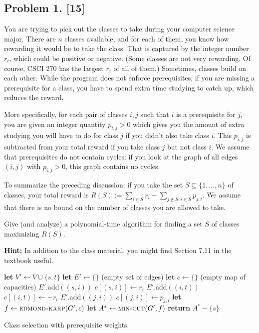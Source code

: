 \documentclass[10pt]{article}
\begin{document}
\newpage

\subsection*{Problem 1. [15]}
You are trying to pick out the classes to take during your computer science major. There are $n$ classes available, and for each of them, you know how rewarding it would be to take the class. That is captured by the integer number $r_i$, which could be positive or negative. (Some classes are not very rewarding. Of course, CSCI 270 has the largest $r_i$ of all of them.)
Sometimes, classes build on each other. While the program does not enforce prerequisites, if you are missing a prerequisite for a class, you have to spend extra time studying to catch up, which reduces the reward.

More specifically, for each pair of classes $i,j$ such that $i$ is a prerequisite for $j$, you are given an integer quantity $p_{i,j} > 0$ which gives you the amount of extra studying you will have to do for class $j$ if you didn't also take class $i$. This $p_{i,j}$ is subtracted from your total reward if you take class $j$ but not class $i$.
We assume that prerequisites do not contain cycles: if you look at the graph of all edges $(i,j)$ with $p_{i,j} > 0$, this graph contains no cycles.

To summarize the preceding discussion: if you take the set $S \subseteq \{1, \ldots, n\}$ of classes, your total reward is $R(S) := \sum_{i \in S} r_i - \sum_{j \notin S, i \in S} p_{j,i}$. We assume that there is no bound on the number of classes you are allowed to take.

Give (and analyze) a polynomial-time algorithm for finding a set $S$ of classes maximizing $R(S)$. 

\textbf{Hint:} In addition to the class material, you might find Section 7.11 in the textbook useful.

\begin{algorithm}[htb]
  \begin{algorithmic}
    \STATE \textbf{let} \(V' \gets V \cup \{s, t\}\)
    \STATE \textbf{let} \(E' \gets \{\}\) (empty set of edges)
    \STATE \textbf{let} \(c \gets \{\}\) (empty map of capacities)
        \STATE \(E'\).add\(((s, i))\)
        \STATE \(c[(s, i)] \gets r_i\)
      \ELSE
        \STATE \(E'\).add\(((i, t))\)
        \STATE \(c[(i, t)] \gets -r_i\)
      \ENDIF
    \ENDFOR
      \STATE \(E'\).add\(((j, i))\)
      \STATE \(c[(j, i)] \gets p_{j, i}\)
    \ENDFOR
    \STATE \textbf{let} \(f \gets \textsc{edmond-karp}(G', c)\)
    \STATE \textbf{let} \(A^* \gets \textsc{min-cut}(G', f)\)
    \STATE \textbf{return} \(A^* - \{s\}\)
  \end{algorithmic}
  \caption{Class selection with prerequisite weights. \label{alg:project-selection}}
\end{algorithm}
\end{document}
